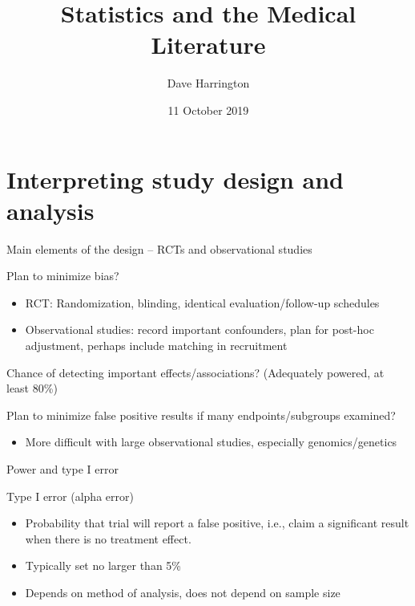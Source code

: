 \documentclass[ignorenonframetext,]{beamer}
\title{Statistics and the Medical Literature}
\author{Dave Harrington}
\date{11 October 2019}
\providecommand{\tightlist}{%
  \setlength{\itemsep}{0pt}\setlength{\parskip}{0pt}}
\begin{document}
\frame{\titlepage}

\begin{frame}
\tableofcontents[hideallsubsections]
\end{frame}
\hypertarget{interpreting-study-design-and-analysis}{%
\section{Interpreting study design and
analysis}\label{interpreting-study-design-and-analysis}}

\begin{frame}{%
\protect\hypertarget{main-elements-of-the-design-rcts-and-observational-studies}{%
Main elements of the design – RCTs and observational studies}}

Plan to minimize bias?

\begin{itemize}
\item
  RCT: Randomization, blinding, identical evaluation/follow-up schedules
\item
  Observational studies: record important confounders, plan for post-hoc
  adjustment, perhaps include matching in recruitment
\end{itemize}

Chance of detecting important effects/associations? (Adequately powered,
at least 80\%) \medskip

Plan to minimize false positive results if many endpoints/subgroups
examined?

\begin{itemize}
\tightlist
\item
  More difficult with large observational studies, especially
  genomics/genetics
\end{itemize}

\end{frame}

\begin{frame}{%
\protect\hypertarget{power-and-type-i-error}{%
Power and type I error}}

Type I error (alpha error)

\begin{itemize}
\item
  Probability that trial will report a false positive, i.e., claim a
  significant result when there is no treatment effect.
\item
  Typically set no larger than 5\%
\item
  Depends on method of analysis, does not depend on sample size
\end{itemize}

\end{frame}
\end{document}
